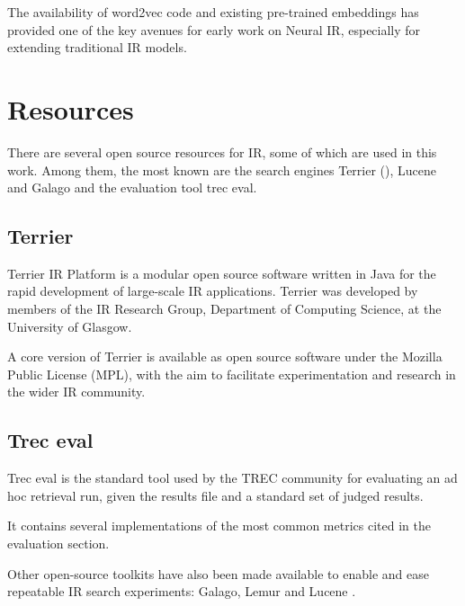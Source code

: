 The availability of word2vec code and existing pre-trained embeddings has provided one of the key avenues for early work on Neural IR, especially for extending traditional IR models.

\section{Resources}

There are several open source resources for IR, some of which are used in this work. Among them, the most known are the search engines Terrier (\cite{terrier}), Lucene and Galago and the evaluation tool trec eval.

\subsection{Terrier}

Terrier IR Platform is a modular open source software written in Java for the rapid development of large-scale IR applications. Terrier was developed by members of the IR Research Group, Department of Computing Science, at the University of Glasgow.

A core version of Terrier is available as open source software under the Mozilla Public License (MPL), with the aim to facilitate experimentation and research in the wider IR community.

\subsection{Trec eval}

Trec eval is the standard tool used by the TREC community for evaluating an ad hoc retrieval run, given the results file and a standard set of judged results. 

It contains several implementations of the most common metrics cited in the evaluation section.

Other open-source toolkits have also been made available to enable and ease repeatable IR search experiments: Galago, Lemur and Lucene \cite{croftIR}.
